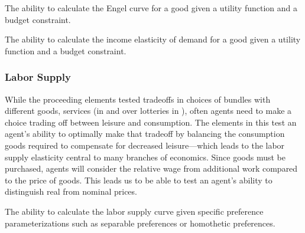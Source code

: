 \begin{el}
    {The ability to calculate the Engel curve for a good given a utility function and a budget constraint.}
\end{el}

\begin{el}
    {The ability to calculate the income elasticity of demand for a good given a utility function and a budget constraint.}
\end{el}

    


\subsubsection{Labor Supply}\label{mod:labor_supply}
While the proceeding elements tested tradeoffs in choices of bundles with different goods, services (in  and over lotteries in ), often agents need to make a choice trading off between leisure and consumption. The elements in this \child test an agent's ability to optimally make that tradeoff by balancing the consumption goods required to compensate for decreased leisure---which leads to the labor supply elasticity central to many branches of economics.   Since goods must be purchased, agents will consider the relative wage from additional work compared to the price of goods.  This leads us to be able to test an agent's ability to distinguish real from nominal prices.

\begin{el}
    {The ability to calculate the labor supply curve given specific preference parameterizations such as separable preferences or homothetic preferences.}
\end{el}

